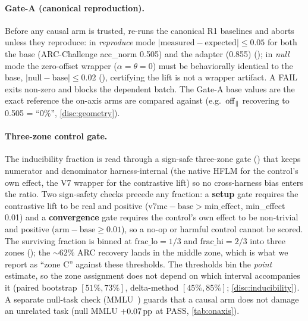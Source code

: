 \paragraph{Gate-A (canonical reproduction).}
Before any causal arm is trusted,  re-runs
the canonical R1 baselines and aborts unless they reproduce: in \emph{reproduce}
mode $|\mathrm{measured} - \mathrm{expected}| \leq 0.05$ for both the base
(ARC-Challenge acc\_norm 0.505) and the adapter (0.855) (); in
\emph{null} mode the zero-offset wrapper ($\alpha{=}\theta{=}0$) must be
behaviorally identical to the base, $|\mathrm{null} - \mathrm{base}| \leq 0.02$
(), certifying the lift is not a wrapper artifact. A FAIL exits non-zero
and blocks the dependent batch. The Gate-A base values are the exact reference the
on-axis arms are compared against (e.g.\ $\mathrm{off}_{\parallel}$ recovering to 0.505 = ``0\%'',
\cref{disc:geometry}).

\paragraph{Three-zone control gate.}
The inducibility fraction is read through a sign-safe three-zone gate
() that keeps numerator and
denominator harness-internal (the native HFLM for the control's own effect, the V7
wrapper for the contrastive lift) so no cross-harness bias enters the ratio. Two
sign-safety checks precede any fraction: a \textbf{setup} gate requires the
contrastive lift to be real and positive ($\mathrm{v7mc} - \mathrm{base} >
\mathrm{min\_effect}$, min\_effect 0.01) and a \textbf{convergence} gate requires
the control's own effect to be non-trivial and positive
($\mathrm{arm} - \mathrm{base} \geq 0.01$), so a no-op or harmful control cannot be
scored. The surviving fraction is binned at $\mathrm{frac\_lo} = 1/3$ and
$\mathrm{frac\_hi} = 2/3$ into three zones (); the
${\sim}62\%$ ARC recovery lands in the middle zone, which is what we report as
``zone C'' against these thresholds. The thresholds bin the \emph{point} estimate, so
the zone assignment does not depend on which interval accompanies it (paired
bootstrap $[51\%, 73\%]$, delta-method $[45\%, 85\%]$; \cref{disc:inducibility}).
A separate null-task check (MMLU~\citep{MMLU}) guards that a causal arm
does not damage an unrelated task (null MMLU $+0.07\,\mathrm{pp}$ at PASS,
\cref{tab:onaxis}).

